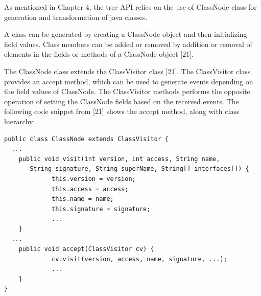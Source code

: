 As mentioned in Chapter 4, the tree API relies on the use of ClassNode class for generation and transformation of java classes. 

A class can be generated by creating a ClassNode object and  then initializing field values. Class members can be added or removed by addition or removal of elements in the fields or methods of a ClassNode object [21]. 

The ClassNode class extends the ClassVisitor class [21]. The ClassVisitor class provides an accept method, which can be used to generate events depending on the field values of ClassNode.  The ClassVisitor methods performs the opposite operation of setting the ClassNode fields based on the received events. The following code snippet from [21] shows the accept method, along with class hierarchy:

\begin{verbatim}
public class ClassNode extends ClassVisitor {
  ...
    public void visit(int version, int access, String name,
       String signature, String superName, String[] interfaces[]) {
             this.version = version;
             this.access = access;
             this.name = name;
             this.signature = signature;
             ...
    }
  ...
    public void accept(ClassVisitor cv) {
             cv.visit(version, access, name, signature, ...);
             ...
    }
} 
\end{verbatim}



